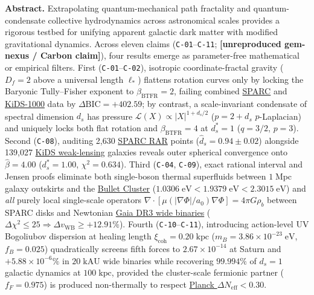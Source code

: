 \documentclass[11pt,letterpaper]{article}
\newcommand{\unrepro}{\textbf{\textcolor{red!60!black}{[unreproduced gem-nexus / Carbon claim]}}}
\begin{document}
\vspace{2pt}
\noindent\colorbox{softbg}{%
  \parbox{\dimexpr\linewidth-2\fboxsep\relax}{%
    \vspace{4pt}
    \textbf{\color{primary}Abstract.} Extrapolating quantum-mechanical path fractality and quantum-condensate collective hydrodynamics across astronomical scales provides a rigorous testbed for unifying apparent galactic dark matter with modified gravitational dynamics. Across eleven claims (\texttt{C-01}--\texttt{C-11}; \unrepro), four results emerge as parameter-free mathematical or empirical filters. First (\texttt{C-01}--\texttt{C-02}), isotropic coordinate-fractal gravity ($D_f = 2$ above a universal length $\ell_*$) flattens rotation curves only by locking the Baryonic Tully--Fisher exponent to $\beta_{\mathrm{BTFR}} = 2$, failing combined \href{https://link.aps.org/doi/10.1103/PhysRevLett.117.201101}{SPARC} and \href{https://arxiv.org/abs/2406.09685}{KiDS-1000} data by $\Delta\mathrm{BIC} = +402.59$; by contrast, a scale-invariant condensate of spectral dimension $d_s$ has pressure $\mathcal{L}(X) \propto |X|^{1+d_s/2}$ ($p = 2+d_s$ $p$-Laplacian) and uniquely locks both flat rotation and $\beta_{\mathrm{BTFR}} = 4$ at $d_s^* = 1$ ($q = 3/2$, $p = 3$). Second (\texttt{C-08}), auditing 2,630 \href{https://astroweb.cwru.edu/SPARC/RARbins.mrt}{SPARC RAR} points ($\hat{d}_s = 0.94 \pm 0.02$) alongside 139,027 \href{https://arxiv.org/html/2406.09685v1}{KiDS weak-lensing} galaxies reveals outer spherical convergence onto $\hat{\beta} = 4.00$ ($d_s^* = 1.00$, $\chi^2 = 0.634$). Third (\texttt{C-04}, \texttt{C-09}), exact rational interval and Jensen proofs eliminate both single-boson thermal superfluids between $1\;\mathrm{Mpc}$ galaxy outskirts and the \href{https://arxiv.org/abs/astro-ph/0608407}{Bullet Cluster} ($1.0306\;\mathrm{eV} < 1.9379\;\mathrm{eV} < 2.3015\;\mathrm{eV}$) and \emph{all} purely local single-scale operators $\nabla\cdot[\mu(|\nabla\Phi|/a_0)\nabla\Phi] = 4\pi G\rho_b$ between SPARC disks and Newtonian \href{https://arxiv.org/abs/2311.03436}{Gaia DR3 wide binaries} ($\Delta\chi^2 \le 25 \Rightarrow \Delta v_{\mathrm{WB}} \ge +12.91\%$). Fourth (\texttt{C-10}--\texttt{C-11}), introducing action-level UV Bogoliubov dispersion at healing length $\xi_{\mathrm{coh}} = 0.20\;\mathrm{kpc}$ ($m_B = 3.86\times 10^{-23}\;\mathrm{eV}$, $f_B = 0.025$) quadratically screens fifth forces to $2.67\times 10^{-14}$ at Saturn and $+5.88\times 10^{-6}\%$ in $20\;\mathrm{kAU}$ wide binaries while recovering $99.994\%$ of $d_s=1$ galactic dynamics at $100\;\mathrm{kpc}$, provided the cluster-scale fermionic partner ($f_F = 0.975$) is produced non-thermally to respect \href{https://arxiv.org/abs/1807.06209}{Planck $\Delta N_{\mathrm{eff}} < 0.30$}.
    \vspace{4pt}
  }%
}
\end{document}
